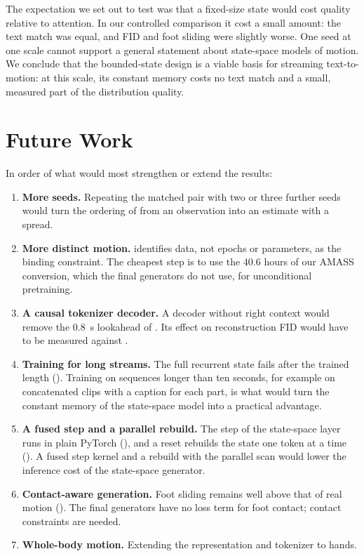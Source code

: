The expectation we set out to test was that a fixed-size state would cost quality relative to attention. In our controlled comparison it cost a small amount: the text match was equal, and FID and foot sliding were slightly worse. One seed at one scale cannot support a general statement about state-space models of motion. We conclude that the bounded-state design is a viable basis for streaming text-to-motion: at this scale, its constant memory costs no text match and a small, measured part of the distribution quality.

\section{Future Work}
\label{sec:conc_future}

In order of what would most strengthen or extend the results:

\begin{enumerate}
\item \textbf{More seeds.} Repeating the matched pair with two or three further seeds would turn the ordering of  from an observation into an estimate with a spread.
\item \textbf{More distinct motion.}  identifies data, not epochs or parameters, as the binding constraint. The cheapest step is to use the $40.6$ hours of our AMASS conversion, which the final generators do not use, for unconditional pretraining.
\item \textbf{A causal tokenizer decoder.} A decoder without right context would remove the $0.8$~s lookahead of . Its effect on reconstruction FID would have to be measured against .
\item \textbf{Training for long streams.} The full recurrent state fails after the trained length (). Training on sequences longer than ten seconds, for example on concatenated clips with a caption for each part, is what would turn the constant memory of the state-space model into a practical advantage.
\item \textbf{A fused step and a parallel rebuild.} The step of the state-space layer runs in plain PyTorch (), and a reset rebuilds the state one token at a time (). A fused step kernel and a rebuild with the parallel scan would lower the inference cost of the state-space generator.
\item \textbf{Contact-aware generation.} Foot sliding remains well above that of real motion (). The final generators have no loss term for foot contact; contact constraints are needed.
\item \textbf{Whole-body motion.} Extending the representation and tokenizer to hands.
\end{enumerate}
